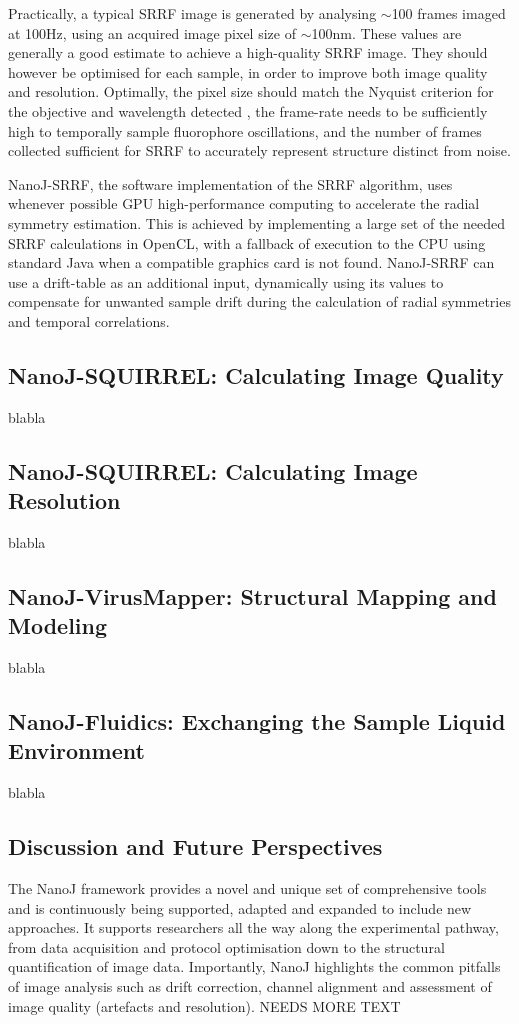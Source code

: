  Practically, a typical SRRF image is generated by analysing $\sim$100 frames imaged at 100Hz, using an acquired image pixel size of $\sim$100nm. These values are generally a good estimate to achieve a high-quality SRRF image. They should however be optimised for each sample, in order to improve both image quality and resolution. Optimally, the pixel size should match the Nyquist criterion for the objective and wavelength detected \cite{pawley2010handbook}, the frame-rate needs to be sufficiently high to temporally sample fluorophore oscillations, and the number of frames collected sufficient for SRRF to accurately represent structure distinct from noise. 
 
 NanoJ-SRRF, the software implementation of the SRRF algorithm, uses whenever possible GPU high-performance computing to accelerate the radial symmetry estimation. This is achieved by implementing a large set of the needed SRRF calculations in OpenCL, with a fallback of execution to the CPU using standard Java when a compatible graphics card is not found. NanoJ-SRRF can use a drift-table as an additional input, dynamically using its values to compensate for unwanted sample drift during the calculation of radial symmetries and temporal correlations.

\subsection*{NanoJ-SQUIRREL: Calculating Image Quality}
blabla

\subsection*{NanoJ-SQUIRREL: Calculating Image Resolution}
blabla

\subsection*{NanoJ-VirusMapper: Structural Mapping and Modeling}
blabla

\subsection*{NanoJ-Fluidics: Exchanging the Sample Liquid Environment}
blabla

\subsection*{Discussion and Future Perspectives}
 The NanoJ framework provides a novel and unique set of comprehensive tools and is continuously being supported, adapted and expanded to include new approaches. It supports researchers all the way along the experimental pathway, from data acquisition and protocol optimisation down to the structural quantification of image data. 
 Importantly, NanoJ highlights the common pitfalls of image analysis such as drift correction, channel alignment and assessment of image quality (artefacts and resolution). NEEDS MORE TEXT

